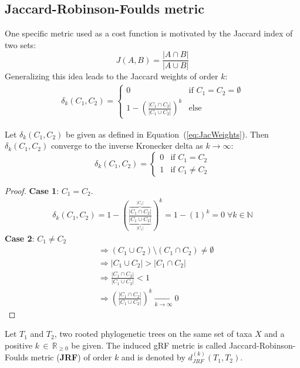 \subsection{Jaccard-Robinson-Foulds metric}
One specific metric used as a cost function is motivated by the Jaccard index of two sets: 
$$J(A,B) = \frac{|A \cap B|}{|A \cup B|}$$
Generalizing this idea leads to the Jaccard weights of order $k$:
\begin{align}\label{eq:JacWeights}
\delta_k(C_1,C_2) = 
\begin{cases}
0 & \text{if } C_1 = C_2 = \emptyset \\
1 - (\frac{|C_1 \cap C_2|}{|C_1 \cup C_2|})^k & \text{else}
\end{cases}
\end{align}
\begin{lem} \label{lem:kron}
Let $\delta_k(C_1,C_2)$ be given as defined in Equation~(\ref{eq:JacWeights}). Then $\delta_k(C_1,C_2)$ converge to the inverse Kronecker delta as $k \to \infty$:
$$\delta_k(C_1,C_2) =
\begin{cases}
0 & \text{if } C_1 = C_2 \\
1 & \text{if } C_1 \neq C_2
\end{cases}$$
\end{lem}
\begin{proof}
\textbf{Case 1}: $C_1 = C_2$.\\
\begin{align*}
\delta_k(C_1,C_2) = 1 - (\frac{\overbrace{|C_1 \cap C_2|}^{|C_1|}}{\underbrace{|C_1 \cup C_2|}_{|C_1|}})^k = 1 - (1)^k = 0 \; \forall k \in \mathbb{N}
\end{align*}
\textbf{Case 2}: $C_1 \neq C_2$
\begin{align*}
&\Rightarrow (C_1 \cup C_2) \setminus (C_1 \cap C_2) \neq \emptyset \\
&\Rightarrow |C_1 \cup C_2| > |C_1 \cap C_2| \\
&\Rightarrow \frac{|C_1 \cap C_2|}{|C_1 \cup C_2|} < 1 \\
&\Rightarrow (\frac{|C_1 \cap C_2|}{|C_1 \cup C_2|})^k \underset{k \to \infty}{\to} 0
\end{align*}
\end{proof}
\begin{defin}
Let $T_1$ and $T_2$, two rooted phylogenetic trees on the same set of taxa $X$ and a positive $k \, \in \, \mathbb{R}_{\geq 0}$ be given. The induced gRF metric is called Jaccard-Robinson-Foulds metric (\textbf{JRF}) of order $k$ and is denoted by $d_{JRF}^{(k)}(T_1,T_2)$.\\
\end{defin}
